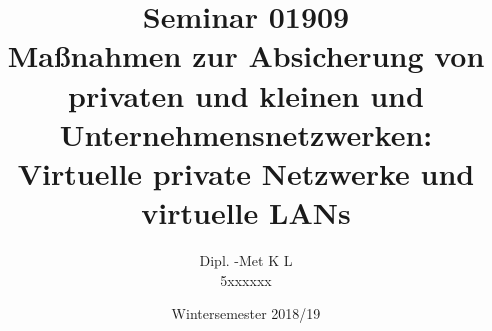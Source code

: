 \documentclass[11pt, a4paper, chapterprefix=false]{scrreprt}
\begin{document}
	
	\begin{titlepage}
	\author{Dipl. -Met K L \\ 5xxxxxx} 
	\title{Seminar 01909\\ Maßnahmen zur Absicherung von privaten und kleinen und Unternehmensnetzwerken: \\ Virtuelle private Netzwerke und virtuelle LANs } 
	\date{Wintersemester 2018/19} 
	\maketitle
	\end{titlepage}
	\newpage 
	\thispagestyle{empty}
	\quad 
	\newpage
	
	
	\tableofcontents
	
	\setcounter{page}{1}
	
	
	
	
	
	
	
	
	
	
	

	\nocite{*} %
	
\end{document}
